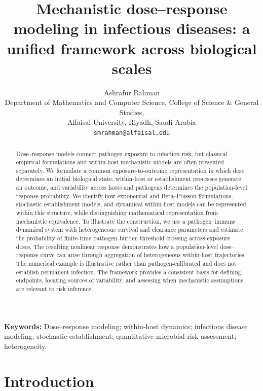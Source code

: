 \documentclass[11pt]{article}
\begin{document}
\title{Mechanistic dose--response modeling in infectious diseases: a unified framework across biological scales}
\author{Ashrafur Rahman\\\small Department of Mathematics and Computer Science, College of Science \& General Studies,\\\small Alfaisal University, Riyadh, Saudi Arabia\\\small \texttt{smrahman@alfaisal.edu}}
\date{}
\maketitle
\begin{abstract}
Dose--response models connect pathogen exposure to infection risk, but classical empirical formulations and within-host mechanistic models are often presented separately. We formulate a common exposure-to-outcome representation in which dose determines an initial biological state, within-host or establishment processes generate an outcome, and variability across hosts and pathogens determines the population-level response probability. We identify how exponential and Beta--Poisson formulations, stochastic establishment models, and dynamical within-host models can be represented within this structure, while distinguishing mathematical representation from mechanistic equivalence. To illustrate the construction, we use a pathogen--immune dynamical system with heterogeneous survival and clearance parameters and estimate the probability of finite-time pathogen-burden threshold crossing across exposure doses. The resulting nonlinear response demonstrates how a population-level dose--response curve can arise through aggregation of heterogeneous within-host trajectories. The numerical example is illustrative rather than pathogen-calibrated and does not establish permanent infection. The framework provides a consistent basis for defining endpoints, locating sources of variability, and assessing when mechanistic assumptions are relevant to risk inference.
\end{abstract}
\noindent\textbf{Keywords:} Dose--response modeling; within-host dynamics; infectious disease modeling; stochastic establishment; quantitative microbial risk assessment; heterogeneity.





\section{Introduction}
\end{document}
